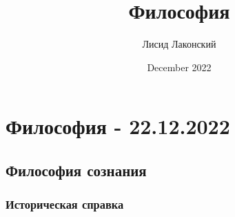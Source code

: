 \documentclass{article}
\title{Философия}
\author{Лисид Лаконский}
\date{December 2022}
\begin{document}
\maketitle
\tableofcontents
\pagebreak

\section{Философия - 22.12.2022}

\subsection{Философия сознания}

\subsubsection{Историческая справка}
\end{document}
